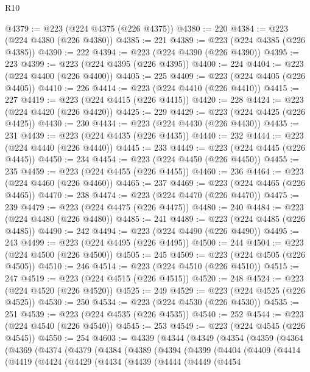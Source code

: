 \begin{lexlean}{R10}
\begin{coremodule}
@4379 := @223 (@224 @4375 (@226 @4375))
@4380 := 220
@4384 := @223 (@224 @4380 (@226 @4380))
@4385 := 221
@4389 := @223 (@224 @4385 (@226 @4385))
@4390 := 222
@4394 := @223 (@224 @4390 (@226 @4390))
@4395 := 223
@4399 := @223 (@224 @4395 (@226 @4395))
@4400 := 224
@4404 := @223 (@224 @4400 (@226 @4400))
@4405 := 225
@4409 := @223 (@224 @4405 (@226 @4405))
@4410 := 226
@4414 := @223 (@224 @4410 (@226 @4410))
@4415 := 227
@4419 := @223 (@224 @4415 (@226 @4415))
@4420 := 228
@4424 := @223 (@224 @4420 (@226 @4420))
@4425 := 229
@4429 := @223 (@224 @4425 (@226 @4425))
@4430 := 230
@4434 := @223 (@224 @4430 (@226 @4430))
@4435 := 231
@4439 := @223 (@224 @4435 (@226 @4435))
@4440 := 232
@4444 := @223 (@224 @4440 (@226 @4440))
@4445 := 233
@4449 := @223 (@224 @4445 (@226 @4445))
@4450 := 234
@4454 := @223 (@224 @4450 (@226 @4450))
@4455 := 235
@4459 := @223 (@224 @4455 (@226 @4455))
@4460 := 236
@4464 := @223 (@224 @4460 (@226 @4460))
@4465 := 237
@4469 := @223 (@224 @4465 (@226 @4465))
@4470 := 238
@4474 := @223 (@224 @4470 (@226 @4470))
@4475 := 239
@4479 := @223 (@224 @4475 (@226 @4475))
@4480 := 240
@4484 := @223 (@224 @4480 (@226 @4480))
@4485 := 241
@4489 := @223 (@224 @4485 (@226 @4485))
@4490 := 242
@4494 := @223 (@224 @4490 (@226 @4490))
@4495 := 243
@4499 := @223 (@224 @4495 (@226 @4495))
@4500 := 244
@4504 := @223 (@224 @4500 (@226 @4500))
@4505 := 245
@4509 := @223 (@224 @4505 (@226 @4505))
@4510 := 246
@4514 := @223 (@224 @4510 (@226 @4510))
@4515 := 247
@4519 := @223 (@224 @4515 (@226 @4515))
@4520 := 248
@4524 := @223 (@224 @4520 (@226 @4520))
@4525 := 249
@4529 := @223 (@224 @4525 (@226 @4525))
@4530 := 250
@4534 := @223 (@224 @4530 (@226 @4530))
@4535 := 251
@4539 := @223 (@224 @4535 (@226 @4535))
@4540 := 252
@4544 := @223 (@224 @4540 (@226 @4540))
@4545 := 253
@4549 := @223 (@224 @4545 (@226 @4545))
@4550 := 254
@4603 := @4339
    (@4344
      (@4349
        (@4354
          (@4359
            (@4364
              (@4369
                (@4374
                  (@4379
                    (@4384
                      (@4389
                        (@4394
                          (@4399
                            (@4404
                              (@4409
                                (@4414
                                  (@4419
                                    (@4424
                                      (@4429
                                        (@4434
                                          (@4439
                                            (@4444
                                              (@4449
                                                (@4454

\end{coremodule}
\end{lexlean}
